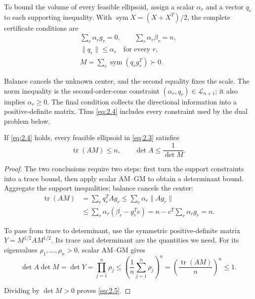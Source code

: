 To bound the volume of every feasible ellipsoid, assign a scalar $\alpha_r$ and
a vector $q_r$ to each supporting inequality. With
$\operatorname{sym}X=(X+X^T)/2$, the complete certificate conditions are
\begin{equation}\label{eq:2.4}
\begin{gathered}
\sum_r\alpha_rg_r=0,\qquad \sum_r\alpha_r\beta_r=n,\\
\|q_r\|\le\alpha_r\quad\text{for every }r,\\
M=\sum_r\operatorname{sym}(q_rg_r^T)\succ0.
\end{gathered}
\end{equation}

Balance cancels the unknown center, and the second equality fixes the scale.
The norm inequality is the second-order-cone constraint
$(\alpha_r,q_r)\in\mathcal L_{n+1}$; it also implies $\alpha_r\ge0$.
The final condition collects the directional information into a positive-definite
matrix. Thus \eqref{eq:2.4} includes every constraint used by the dual problem below.

\begin{lemma}\label{lem-certificate}
If \eqref{eq:2.4} holds, every feasible ellipsoid in \eqref{eq:2.3} satisfies
\begin{equation}\label{eq:2.5}
\operatorname{tr}(AM)\le n,\qquad
\det A\le\frac1{\det M}.
\end{equation}

\end{lemma}

\begin{proof}
The two conclusions require two steps: first turn the support
constraints into a trace bound, then apply scalar AM--GM to obtain a determinant
bound. Aggregate the support inequalities; balance cancels the center:
\begin{equation}\label{eq:2.6}
\begin{aligned}
\operatorname{tr}(AM)
&=\sum_r q_r^TAg_r
\le\sum_r\alpha_r\|Ag_r\|\\
&\le\sum_r\alpha_r(\beta_r-g_r^Tc)
=n-c^T\sum_r\alpha_rg_r=n.
\end{aligned}
\end{equation}

To pass from trace to determinant, use the symmetric positive-definite matrix
$Y=M^{1/2}AM^{1/2}$. Its trace and determinant are the quantities we need.
For its eigenvalues $\rho_1,\ldots,\rho_n>0$, scalar AM--GM gives
\begin{equation}\label{eq:2.7}
\det A\det M=\det Y=\prod_{j=1}^n\rho_j
\le\left(\frac1n\sum_{j=1}^n\rho_j\right)^n
=\left(\frac{\operatorname{tr}(AM)}n\right)^n\le1.
\end{equation}

Dividing by $\det M>0$ proves \eqref{eq:2.5}. 
\end{proof}

